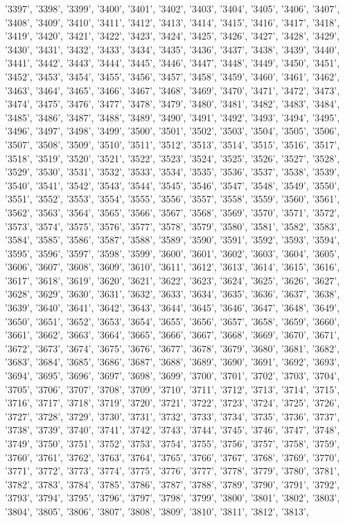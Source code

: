 '3397', '3398', '3399', '3400', '3401', '3402', '3403', '3404', '3405', '3406', '3407', '3408', '3409', '3410', '3411', '3412', '3413', '3414', '3415', '3416', '3417', '3418', '3419', '3420', '3421', '3422', '3423', '3424', '3425', '3426', '3427', '3428', '3429', '3430', '3431', '3432', '3433', '3434', '3435', '3436', '3437', '3438', '3439', '3440', '3441', '3442', '3443', '3444', '3445', '3446', '3447', '3448', '3449', '3450', '3451', '3452', '3453', '3454', '3455', '3456', '3457', '3458', '3459', '3460', '3461', '3462', '3463', '3464', '3465', '3466', '3467', '3468', '3469', '3470', '3471', '3472', '3473', '3474', '3475', '3476', '3477', '3478', '3479', '3480', '3481', '3482', '3483', '3484', '3485', '3486', '3487', '3488', '3489', '3490', '3491', '3492', '3493', '3494', '3495', '3496', '3497', '3498', '3499', '3500', '3501', '3502', '3503', '3504', '3505', '3506', '3507', '3508', '3509', '3510', '3511', '3512', '3513', '3514', '3515', '3516', '3517', '3518', '3519', '3520', '3521', '3522', '3523', '3524', '3525', '3526', '3527', '3528', '3529', '3530', '3531', '3532', '3533', '3534', '3535', '3536', '3537', '3538', '3539', '3540', '3541', '3542', '3543', '3544', '3545', '3546', '3547', '3548', '3549', '3550', '3551', '3552', '3553', '3554', '3555', '3556', '3557', '3558', '3559', '3560', '3561', '3562', '3563', '3564', '3565', '3566', '3567', '3568', '3569', '3570', '3571', '3572', '3573', '3574', '3575', '3576', '3577', '3578', '3579', '3580', '3581', '3582', '3583', '3584', '3585', '3586', '3587', '3588', '3589', '3590', '3591', '3592', '3593', '3594', '3595', '3596', '3597', '3598', '3599', '3600', '3601', '3602', '3603', '3604', '3605', '3606', '3607', '3608', '3609', '3610', '3611', '3612', '3613', '3614', '3615', '3616', '3617', '3618', '3619', '3620', '3621', '3622', '3623', '3624', '3625', '3626', '3627', '3628', '3629', '3630', '3631', '3632', '3633', '3634', '3635', '3636', '3637', '3638', '3639', '3640', '3641', '3642', '3643', '3644', '3645', '3646', '3647', '3648', '3649', '3650', '3651', '3652', '3653', '3654', '3655', '3656', '3657', '3658', '3659', '3660', '3661', '3662', '3663', '3664', '3665', '3666', '3667', '3668', '3669', '3670', '3671', '3672', '3673', '3674', '3675', '3676', '3677', '3678', '3679', '3680', '3681', '3682', '3683', '3684', '3685', '3686', '3687', '3688', '3689', '3690', '3691', '3692', '3693', '3694', '3695', '3696', '3697', '3698', '3699', '3700', '3701', '3702', '3703', '3704', '3705', '3706', '3707', '3708', '3709', '3710', '3711', '3712', '3713', '3714', '3715', '3716', '3717', '3718', '3719', '3720', '3721', '3722', '3723', '3724', '3725', '3726', '3727', '3728', '3729', '3730', '3731', '3732', '3733', '3734', '3735', '3736', '3737', '3738', '3739', '3740', '3741', '3742', '3743', '3744', '3745', '3746', '3747', '3748', '3749', '3750', '3751', '3752', '3753', '3754', '3755', '3756', '3757', '3758', '3759', '3760', '3761', '3762', '3763', '3764', '3765', '3766', '3767', '3768', '3769', '3770', '3771', '3772', '3773', '3774', '3775', '3776', '3777', '3778', '3779', '3780', '3781', '3782', '3783', '3784', '3785', '3786', '3787', '3788', '3789', '3790', '3791', '3792', '3793', '3794', '3795', '3796', '3797', '3798', '3799', '3800', '3801', '3802', '3803', '3804', '3805', '3806', '3807', '3808', '3809', '3810', '3811', '3812', '3813', 